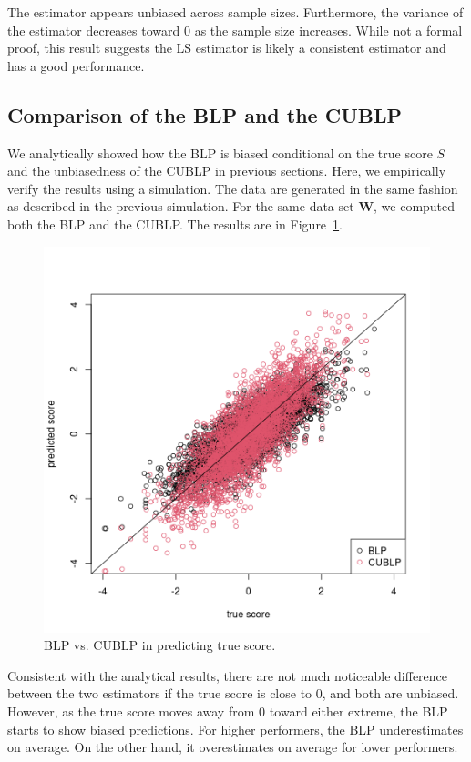 \documentclass[man, floatsintext]{apa7}
\newcommand{\mbf}[1]{\bm{#1}}
\newcommand{\bW}{\mbf{W}}
\begin{document}
  The estimator appears unbiased across sample sizes. Furthermore, the variance
  of the estimator decreases toward 0 as the sample size increases. While not a
  formal proof, this result suggests the LS estimator is likely a consistent
  estimator and has a good performance.

  \subsection{Comparison of the BLP and the CUBLP}
  We analytically showed how the BLP is biased conditional on the true score $S$
  and the unbiasedness of the CUBLP in previous sections. Here, we empirically
  verify the results using a simulation. The data are generated in the same
  fashion as described in the previous simulation. For the same data set $\bW$,
  we computed both the BLP and the CUBLP. The results are in Figure~\ref{fig:prediction}.
  \begin{figure}[t]
     \centering{}
     \includegraphics[scale=0.55]{fig/prediction.png}
     \caption{BLP vs. CUBLP in predicting true score.}
     \label{fig:prediction}
  \end{figure}
  Consistent with the analytical results, there are not much noticeable
  difference between the two estimators if the true score is close to $0$, and
  both are unbiased. However, as the true score moves away from $0$ toward
  either extreme, the BLP starts to show biased predictions. For higher
  performers, the BLP underestimates on average. On the other hand, it
  overestimates on average for lower performers.
\end{document}
